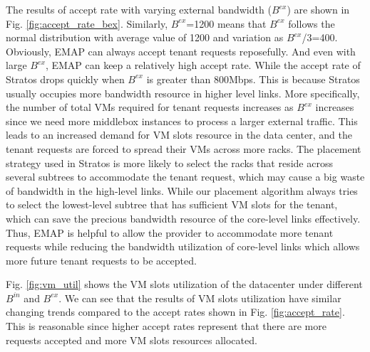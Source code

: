 \documentclass[review]{elsarticle}
\begin{document}
The results of accept rate with varying external bandwidth ($B^{ex}$) are shown in Fig. \ref{fig:accept_rate_bex}. Similarly, $B^{ex}$=1200 means that $B^{ex}$ follows the normal distribution with average value of 1200 and variation as $B^{ex}$/3=400. Obviously, EMAP can always accept tenant requests reposefully. And even with large $B^{ex}$, EMAP can keep a relatively high accept rate. While the accept rate of Stratos drops quickly when $B^{ex}$ is greater than 800Mbps. This is because Stratos usually occupies more bandwidth resource in higher level links. More specifically, the number of total VMs required for tenant requests increases as $B^{ex}$ increases since we need more middlebox instances to process a larger external traffic. This leads to an increased demand for VM slots resource in the data center, and the tenant requests are forced to spread their VMs across more racks. The placement strategy used in Stratos is more likely to select the racks that reside across several subtrees to accommodate the tenant request, which may cause a big waste of bandwidth in the high-level links. While our placement algorithm always tries to select the lowest-level subtree that has sufficient VM slots for the tenant, which can save the precious bandwidth resource of the core-level links effectively. Thus, EMAP is helpful to allow the provider to accommodate more tenant requests while reducing the bandwidth utilization of core-level links which allows more future tenant requests to be accepted.

Fig. \ref{fig:vm_util} shows the VM slots utilization of the datacenter under different $B^{in}$ and $B^{ex}$. We can see that the results of VM slots utilization have similar changing trends compared to the accept rates shown in Fig. \ref{fig:accept_rate}.
This is reasonable since higher accept rates represent that there are more requests accepted and more VM slots resources allocated.  
\end{document}
